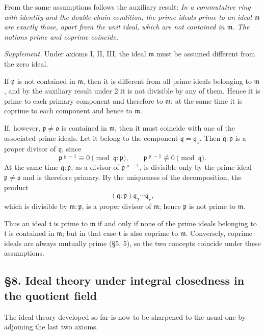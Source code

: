 \documentclass[11pt]{article}
\providecommand{\mm}{\mathfrak{m}}
\providecommand{\mo}{\mathfrak{o}}
\providecommand{\mpideal}{\mathfrak{p}}
\providecommand{\mq}{\mathfrak{q}}
\providecommand{\mt}{\mathfrak{t}}
\begin{document}
From the same assumptions follows the auxiliary result: \emph{In a commutative ring with identity and the double-chain condition, the prime ideals prime to an ideal $\mm$ are exactly those, apart from the unit ideal, which are not contained in $\mm$. The notions prime and coprime coincide.}

\emph{Supplement.} Under axioms I, II, III, the ideal $\mm$ must be assumed different from the zero ideal.

If $\mpideal$ is not contained in $\mm$, then it is different from all prime ideals belonging to $\mm$, and by the auxiliary result under 2 it is not divisible by any of them. Hence it is prime to each primary component and therefore to $\mm$; at the same time it is coprime to each component and hence to $\mm$.

If, however, $\mpideal\ne\mo$ is contained in $\mm$, then it must coincide with one of the associated prime ideals. Let it belong to the component $\mq=\mq_1$. Then $\mq:\mpideal$ is a proper divisor of $\mq$, since
\[
        \mpideal^{\varrho-1}\equiv0\pmod{\mq:\mpideal},\qquad
        \mpideal^{\varrho-1}\not\equiv0\pmod{\mq}.
\]
At the same time $\mq:\mpideal$, as a divisor of $\mpideal^{\varrho-1}$, is divisible only by the prime ideal $\mpideal\ne\mo$ and is therefore primary. By the uniqueness of the decomposition, the product
\[
        (\mq:\mpideal)\mq_2\cdots\mq_r,
\]
which is divisible by $\mm:\mpideal$, is a proper divisor of $\mm$; hence $\mpideal$ is not prime to $\mm$.

Thus an ideal $\mt$ is prime to $\mm$ if and only if none of the prime ideals belonging to $\mt$ is contained in $\mm$; but in that case $\mt$ is also coprime to $\mm$. Conversely, coprime ideals are always mutually prime (§5, 5), so the two concepts coincide under these assumptions.

\subsection*{§8. Ideal theory under integral closedness in the quotient field}

The ideal theory developed so far is now to be sharpened to the usual one by adjoining the last two axioms.
\end{document}
